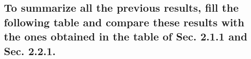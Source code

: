 \documentclass{report}
\begin{document}
{			\subsection{To summarize all the previous results, fill the following table and compare these results with the ones obtained in the table of Sec. 2.1.1 and Sec. 2.2.1.}
}
\end{document}
